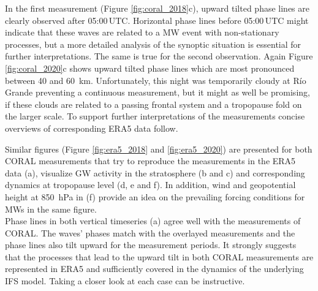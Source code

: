 In the first measurement (Figure \ref{fig:coral_2018}c), upward tilted phase lines are clearly observed after 05:00$ \, \mathrm{UTC}$. Horizontal phase lines before 05:00$ \, \mathrm{UTC}$ might indicate that these waves are related to a MW event with non-stationary processes, but a more detailed analysis of the synoptic situation is essential for further interpretations. The same is true for the second observation. Again Figure \ref{fig:coral_2020}c shows upward tilted phase lines which are most pronounced between 40 and \SI{60}{\kilo\meter}. Unfortunately, this night was temporarily cloudy at Río Grande preventing a continuous measurement, but it might as well be promising, if these clouds are related to a passing frontal system and a tropopause fold on the larger scale. To support further interpretations of the measurements concise overviews of corresponding ERA5 data follow.

Similar figures (Figure \ref{fig:era5_2018} and \ref{fig:era5_2020}) are presented for both CORAL measurements that try to reproduce the measurements in the ERA5 data (a), visualize GW activity in the stratosphere (b and c) and corresponding dynamics at tropopause level (d, e and f). In addition, wind and geopotential height at \SI{850}{hPa} in (f) provide an idea on the prevailing forcing conditions for MWs in the same figure. \\
Phase lines in both vertical timeseries (a) agree well with the measurements of CORAL. The waves' phases match with the overlayed measurements and the phase lines also tilt upward for the measurement periods. It strongly suggests that the processes that lead to the upward tilt in both CORAL measurements are represented in ERA5 and sufficiently covered in the dynamics of the underlying IFS model. Taking a closer look at each case can be instructive.

